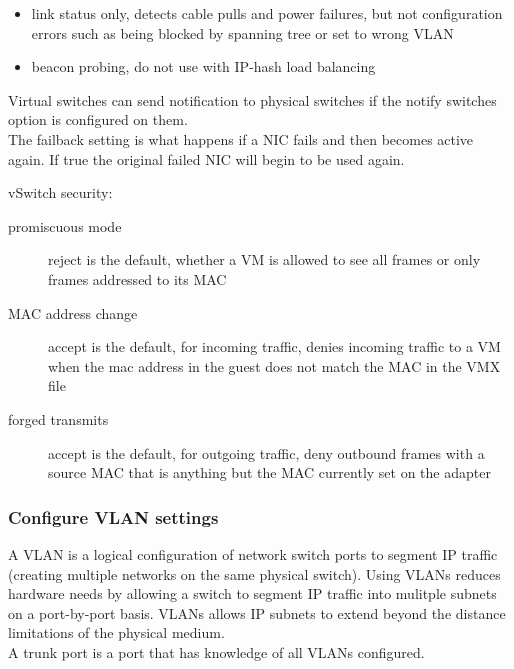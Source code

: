 \begin{itemize}

\item link status only, detects cable pulls and power failures, but not
configuration errors such as being blocked by spanning tree or set to wrong
VLAN

\item beacon probing, do not use with IP-hash load balancing

\end{itemize}

Virtual switches can send notification to physical switches if the notify
switches option is configured on them.\\

The failback setting is what happens if a NIC fails and then becomes active
again. If true the original failed NIC will begin to be used again.

vSwitch security:

\begin{description}

\item[promiscuous mode]
reject is the default, whether a VM is allowed to see all frames or only
frames addressed to its MAC

\item[MAC address change]
accept is the default, for incoming traffic, denies incoming traffic to a VM
when the mac address in the guest does not match the MAC in the VMX file

\item[forged transmits]
accept is the default, for outgoing traffic, deny outbound frames with a
source MAC that is anything but the MAC currently set on the adapter

\end{description}

\subsubsection{Configure VLAN settings}

A VLAN is a logical configuration of network switch ports to segment IP
traffic (creating multiple networks on the same physical switch). Using VLANs
reduces hardware needs by allowing a switch to segment IP traffic into
mulitple subnets on a port-by-port basis. VLANs allows IP subnets to extend
beyond the distance limitations of the physical medium.\\

A trunk port is a port that has knowledge of all VLANs configured.\\

